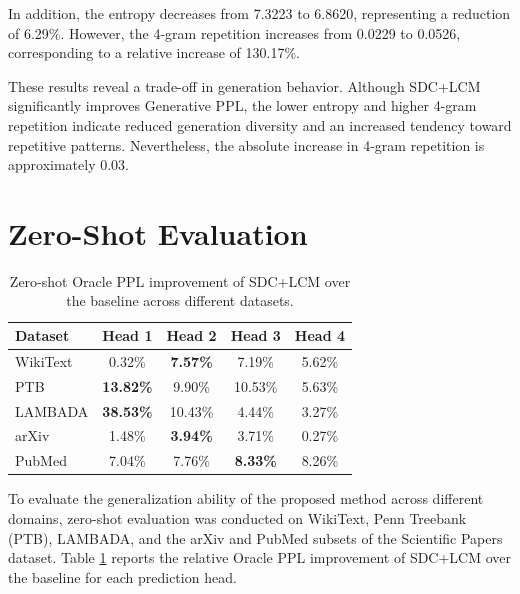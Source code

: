 In addition, the entropy decreases from 7.3223 to 6.8620, representing
a reduction of 6.29\%. However, the 4-gram repetition increases from
0.0229 to 0.0526, corresponding to a relative increase of 130.17\%.

These results reveal a trade-off in generation behavior. Although
SDC+LCM significantly improves Generative PPL, the lower entropy and
higher 4-gram repetition indicate reduced generation diversity and an
increased tendency toward repetitive patterns. Nevertheless, the
absolute increase in 4-gram repetition is approximately 0.03.

\section{Zero-Shot Evaluation}\label{sec:zero_shot_evaluation}

\begin{table}[!htbp]
    \centering
    \caption{Zero-shot Oracle PPL improvement of SDC+LCM over the baseline across different datasets.}
    \label{tab:zero_shot_ppl}
    \begin{tabular}{lcccc}
        \toprule[1.25pt]
        Dataset
        & Head 1
        & Head 2
        & Head 3
        & Head 4 \\
        \midrule

        WikiText
        & 0.32\%
        & \textbf{7.57\%}
        & 7.19\%
        & 5.62\% \\

        PTB
        & \textbf{13.82\%}
        & 9.90\%
        & 10.53\%
        & 5.63\% \\

        LAMBADA
        & \textbf{38.53\%}
        & 10.43\%
        & 4.44\%
        & 3.27\% \\

        arXiv
        & 1.48\%
        & \textbf{3.94\%}
        & 3.71\%
        & 0.27\% \\

        PubMed
        & 7.04\%
        & 7.76\%
        & \textbf{8.33\%}
        & 8.26\% \\

        \bottomrule[1.25pt]
    \end{tabular}
\end{table}

To evaluate the generalization ability of the proposed method across
different domains, zero-shot evaluation was conducted on WikiText\cite{merity2016wikitext},
Penn Treebank (PTB)\cite{marcus1993ptb}, LAMBADA\cite{paperno2016lambada}, and the arXiv and PubMed subsets of the Scientific Papers dataset\cite{cohan2018scientificpapers}.
Table \ref{tab:zero_shot_ppl} reports the relative Oracle PPL improvement
of SDC+LCM over the baseline for each prediction head.

